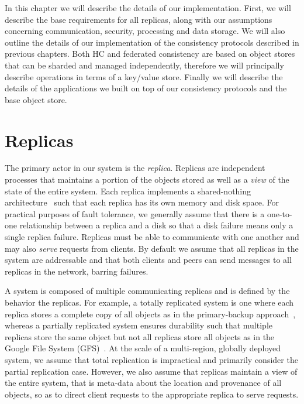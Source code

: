 In this chapter we will describe the details of our implementation.
First, we will describe the base requirements for all replicas, along with our assumptions concerning communication, security, processing and data storage.
We will also outline the details of our implementation of the consistency protocols described in previous chapters.
Both HC and federated consistency are based on object stores that can be sharded and managed independently, therefore we will principally describe operations in terms of a key/value store.
Finally we will describe the details of the applications we built on top of our consistency protocols and the base object store.

\section{Replicas}
\label{ch05_replicas}

The primary actor in our system is the \emph{replica}.
Replicas are independent processes that maintains a portion of the objects stored as well as a \emph{view} of the state of the entire system.
Each replica implements a shared-nothing architecture~\cite{shared_nothing} such that each replica has its own memory and disk space.
For practical purposes of fault tolerance, we generally assume that there is a one-to-one relationship between a replica and a disk so that a disk failure means only a single replica failure.
Replicas must be able to communicate with one another and may also \emph{serve} requests from clients.
By default we assume that all replicas in the system are addressable and that both clients and peers can send messages to all replicas in the network, barring failures.

A system is composed of multiple communicating replicas and is defined by the behavior the replicas.
For example, a totally replicated system is one where each replica stores a complete copy of all objects as in the primary-backup approach~\cite{primary_backup}, whereas a partially replicated system ensures durability such that multiple replicas store the same object but not all replicas store all objects as in the Google File System (GFS)~\cite{gfs}.
At the scale of a multi-region, globally deployed system, we assume that total replication is impractical and primarily consider the partial replication case.
However, we also assume that replicas maintain a view of the entire system, that is meta-data about the location and provenance of all objects, so as to direct client requests to the appropriate replica to serve requests.

